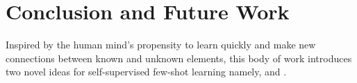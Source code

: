\chapter{Conclusion and Future Work}\label{chap:future-work}

Inspired by the human mind's propensity to learn quickly and make new connections between known and unknown elements, this body of work introduces two novel ideas for self-supervised few-shot learning namely, \ccclr{} and \samptr{}.
